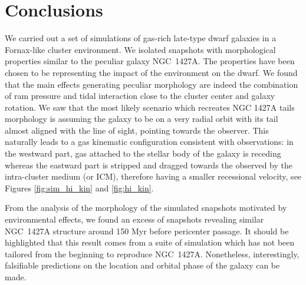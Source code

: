 
\section{Conclusions}
We carried out a set of simulations of gas-rich late-type dwarf galaxies in a Fornax-like cluster environment.
We isolated snapshots with morphological properties similar to the peculiar galaxy NGC~1427A. The properties have been chosen to be representing the impact of the environment on the dwarf.
We found that the main effects generating peculiar morphology are indeed the combination of ram pressure and tidal interaction close to the cluster center and galaxy rotation.
We saw that the most likely scenario which recreates NGC 1427A tails morphology is assuming the galaxy to be on a very radial orbit with its tail almost aligned with the line of sight, pointing towards the observer.
This naturally leads to a gas kinematic configuration consistent with \Hi{} observations: in the westward part, gas attached to the stellar body of the galaxy is receding whereas the eastward part is stripped and dragged towards the observed by the intra-cluster medium (or ICM), therefore having a smaller recessional velocity, see Figures \ref{fig:sim_hi_kin} and \ref{fig:hi_kin}.

From the analysis of the morphology of the simulated snapshots motivated by environmental effects, we found an excess of snapshots revealing similar NGC~1427A structure around 150 Myr before pericenter passage.
It should be highlighted that this result comes from a suite of simulation which has not been tailored from the beginning to reproduce NGC~1427A.
Nonetheless, interestingly, falsifiable predictions on the location and orbital phase of the galaxy can be made.  


